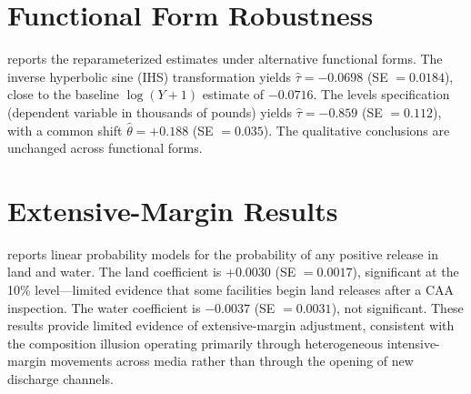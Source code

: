 \documentclass[12pt]{article}
\begin{document}
\section{Functional Form Robustness}
\label{sec:funcform_appendix}



 reports the reparameterized estimates under alternative functional forms. The inverse hyperbolic sine (IHS) transformation yields $\hat{\tau} = -0.0698$ (SE $= 0.0184$), close to the baseline $\log(Y+1)$ estimate of $-0.0716$. The levels specification (dependent variable in thousands of pounds) yields $\hat{\tau} = -0.859$ (SE $= 0.112$), with a common shift $\hat{\theta} = +0.188$ (SE $= 0.035$). The qualitative conclusions are unchanged across functional forms.


\section{Extensive-Margin Results}
\label{sec:extensive_appendix}



 reports linear probability models for the probability of any positive release in land and water. The land coefficient is $+0.0030$ (SE $= 0.0017$), significant at the 10\% level---limited evidence that some facilities begin land releases after a CAA inspection. The water coefficient is $-0.0037$ (SE $= 0.0031$), not significant. These results provide limited evidence of extensive-margin adjustment, consistent with the composition illusion operating primarily through heterogeneous intensive-margin movements across media rather than through the opening of new discharge channels.
\end{document}
